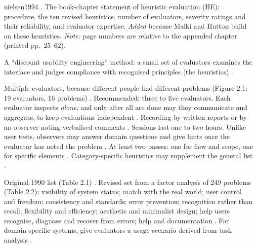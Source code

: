 \begin{papercard}{nielsen1994}
  . The book-chapter statement of heuristic evaluation (HE): procedure, the ten revised heuristics, number of evaluators, severity ratings and their reliability, and evaluator expertise. \emph{Added} because Malki and Hutton build on these heuristics. \emph{Note:} page numbers are relative to the appended chapter (printed pp.\ 25--62).

 A ``discount usability engineering'' method: a small set of evaluators examines the interface and judges compliance with recognised principles (the heuristics) .

 Multiple evaluators, because different people find different problems (Figure 2.1: 19 evaluators, 16 problems) . Recommended: three to five evaluators. Each evaluator inspects \emph{alone}, and only after all are done may they communicate and aggregate, to keep evaluations independent . Recording by written reports or by an observer noting verbalised comments . Sessions last one to two hours. Unlike user tests, observers may answer domain questions and give hints once the evaluator has noted the problem . At least two passes: one for flow and scope, one for specific elements . Category-specific heuristics may supplement the general list .

 Original 1990 list (Table 2.1) . Revised set from a factor analysis of 249 problems (Table 2.2): visibility of system status; match with the real world; user control and freedom; consistency and standards; error prevention; recognition rather than recall; flexibility and efficiency; aesthetic and minimalist design; help users recognise, diagnose and recover from errors; help and documentation . For domain-specific systems, give evaluators a usage scenario derived from task analysis .


\end{papercard}
